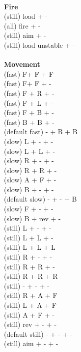\ \\ {\bf Fire } \\
(still) load + - \\
(all) fire + - \\
(still) aim + - \\
(still) load unstable + -  \\
\ \\ {\bf Movement } \\
(fast) F+ F + F \\
(fast) F+ F + - \\
(fast) F + R + - \\
(fast) F + L + - \\
(fast) F + B + - \\
(fast) B + B + - \\
(default fast) - + B + B \\
(slow) L + - + - \\
(slow) L + L + - \\
(slow) R + - + - \\
(slow) R + R + - \\
(slow) A + F + - \\
(slow) B + - + - \\
(default slow)  - + - + B \\
(slow) F + - + - \\
(slow) B + rev + - \\
(still) L + - + - \\
(still) L + L + - \\
(still) L + L + L \\
(still) R + - + - \\
(still) R + R + - \\
(still) R + R + R \\
(still) - + - + - \\
(still) R + A + F \\
(still) L + A + F \\
(still) A + F + - \\
(still) rev + - + - \\
(default still) - + - + - \\
(still) aim + - + - \\



